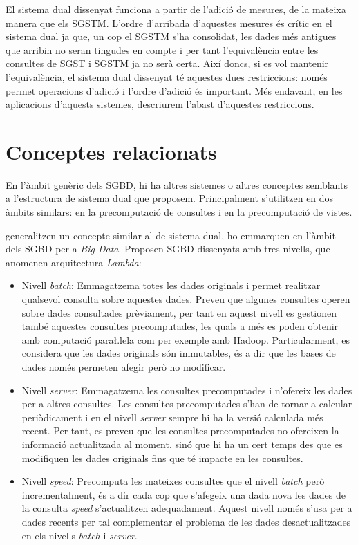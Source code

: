 El sistema dual dissenyat funciona a partir de l'adició de mesures, de
la mateixa manera que els \gls{SGSTM}. L'ordre d'arribada d'aquestes
mesures és crític en el sistema dual ja que, un cop el \gls{SGSTM}
s'ha consolidat, les dades més antigues que arribin no seran tingudes
en compte i per tant l'equivalència entre les consultes de \gls{SGST}
i \gls{SGSTM} ja no serà certa. Així doncs, si es vol mantenir
l'equivalència, el sistema dual dissenyat té aquestes dues
restriccions: només permet operacions d'adició i l'ordre d'adició és
important.  Més endavant, en les aplicacions d'aquests sistemes,
descriurem l'abast d'aquestes restriccions.




\section{Conceptes relacionats}

En l'àmbit genèric dels \gls{SGBD}, hi ha altres sistemes o altres
conceptes semblants a l'estructura de sistema dual que
proposem. Principalment s'utilitzen en dos àmbits similars: en la
precomputació de consultes i en la precomputació de vistes.



\textcite{marz13:nosql13, marz14:bigdata} generalitzen un concepte
similar al de sistema dual, ho emmarquen en l'àmbit dels \gls{SGBD}
per a \emph{Big Data}.  Proposen \gls{SGBD} dissenyats amb tres
nivells, que anomenen arquitectura \emph{Lambda}:
\begin{itemize}
\item Nivell \emph{batch}: Emmagatzema totes les dades originals i
  permet realitzar qualsevol consulta sobre aquestes dades. Preveu que
  algunes consultes operen sobre dades consultades prèviament, per
  tant en aquest nivell es gestionen també aquestes consultes
  precomputades, les quals a més es poden obtenir amb computació
  para\l.lela com per exemple amb Hadoop. Particularment, es considera
  que les dades originals són immutables, és a dir que les bases de
  dades només permeten afegir però no modificar.

\item Nivell \emph{server}: Emmagatzema les consultes precomputades i
  n'ofereix les dades per a altres consultes. Les consultes
  precomputades s'han de tornar a calcular periòdicament i en el
  nivell \emph{server} sempre hi ha la versió calculada més
  recent. Per tant, es preveu que les consultes precomputades no
  ofereixen la informació actualitzada al moment, sinó que hi ha un
  cert temps des que es modifiquen les dades originals fins que té
  impacte en les consultes.

\item Nivell \emph{speed}: Precomputa les mateixes consultes que el
  nivell \emph{batch} però incrementalment, és a dir cada cop que
  s'afegeix una dada nova les dades de la consulta \emph{speed}
  s'actualitzen adequadament.  Aquest nivell només s'usa per a dades
  recents per tal complementar el problema de les dades
  desactualitzades en els nivells \emph{batch} i \emph{server}.
\end{itemize}

